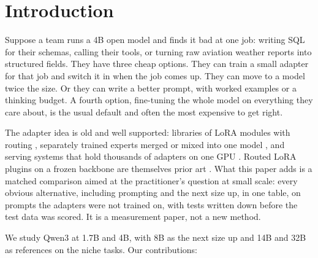 \documentclass[11pt]{article}
\begin{document}
\section{Introduction}

Suppose a team runs a 4B open model and finds it bad at one job: writing SQL for their schemas, calling their tools,
or turning raw aviation weather reports into structured fields. They have three cheap options. They can train a
small adapter for that job and switch it in when the job comes up. They can move to a model twice the size. Or they
can write a better prompt, with worked examples or a thinking budget. A fourth option, fine-tuning the whole model on
everything they care about, is the usual default and often the most expensive to get right.

The adapter idea is old and well supported: libraries of LoRA modules with routing
\citep{ostapenko2024arrow,huang2024lorahub,wu2024mole,buehler2024xlora}, separately trained experts merged or mixed
into one model \citep{li2022btm,sukhbaatar2024btx,shi2025flexolmo,morrison2026bar}, and serving systems that hold
thousands of adapters on one GPU \citep{sheng2023slora,chen2023punica}. Routed LoRA plugins on a frozen backbone
are themselves prior art \citep{dou2023loramoe}. What this paper adds is a matched comparison aimed at the
practitioner's question at small scale: every obvious alternative, including prompting and the next size up, in one
table, on prompts the adapters were not trained on, with tests written down before the test data was scored. It is a
measurement paper, not a new method.

We study Qwen3 \citep{yang2025qwen3} at 1.7B and 4B, with 8B as the next size up and 14B and 32B as references on the
niche tasks. Our contributions:
\end{document}
